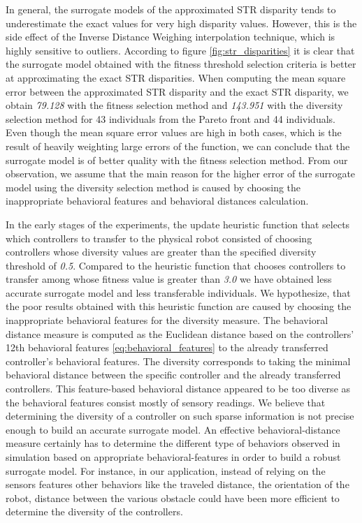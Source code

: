 In general, the surrogate models of the approximated STR disparity tends to underestimate the exact values for very high disparity values. However, this is the side effect of the Inverse Distance Weighing interpolation technique, which is highly sensitive to outliers. According to figure \ref{fig:str_disparities} it is clear that the surrogate model obtained with the fitness threshold selection criteria is better at approximating the exact STR disparities. When computing the mean square error between the approximated STR disparity and the exact STR disparity, we obtain \textit{79.128} with the fitness selection method and \textit{143.951} with the diversity selection method for 43 individuals from the Pareto front and 44 individuals. Even though the mean square error values are high in both cases, which is the result of heavily weighting large errors of the function, we can conclude that the surrogate model is of better quality with the fitness selection method. From our observation, we assume that the main reason for the higher error of the surrogate model using the diversity selection method is caused by choosing the inappropriate behavioral features and behavioral distances calculation.

In the early stages of the experiments, the update heuristic function that selects which controllers to transfer to the physical robot consisted of choosing controllers whose diversity values are greater than the specified diversity threshold of \textit{0.5}. Compared to the heuristic function that chooses controllers to transfer among whose fitness value is greater than \textit{3.0} we have obtained less accurate surrogate model and less transferable individuals. We hypothesize, that the poor results obtained with this heuristic function are caused by choosing the inappropriate behavioral features for the diversity measure. The behavioral distance measure is computed as the Euclidean distance based on the controllers' 12th behavioral features \ref{eq:behavioral_features} to the already transferred controller's behavioral features. The diversity corresponds to taking the minimal behavioral distance between the specific controller and the already transferred controllers. This feature-based behavioral distance appeared to be too diverse as the behavioral features consist mostly of sensory readings. We believe that determining the diversity of a controller on such sparse information is not precise enough to build an accurate surrogate model. An effective behavioral-distance measure certainly has to determine the different type of behaviors observed in simulation based on appropriate behavioral-features in order to build a robust surrogate model. For instance, in our application, instead of relying on the sensors features other behaviors like the traveled distance, the orientation of the robot, distance between the various obstacle could have been more efficient to determine the diversity of the controllers.




